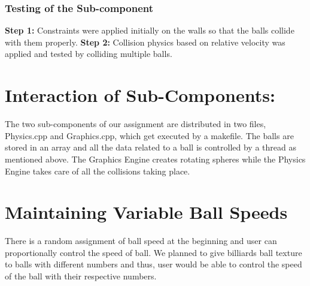 \documentclass{report}
\begin{document}
\subsubsection{Testing of the Sub-component}
 
\textbf{Step 1:} Constraints were applied initially on the walls so that the balls collide with them properly.
\linebreak
\linebreak
\textbf{Step 2:} Collision physics based on relative velocity was applied and tested by colliding multiple balls.
\linebreak
\linebreak
\pagebreak

\section{Interaction of Sub-Components:}
The two sub-components of our assignment are distributed in two files, Physics.cpp and Graphics.cpp, which get executed by a makefile. The balls are stored in an array and all the data related to a ball is controlled by a thread as mentioned above. The Graphics Engine creates rotating spheres while the Physics Engine takes care of all the collisions taking place.

\section{Maintaining Variable Ball Speeds}
There is a random assignment of ball speed at the beginning and user can proportionally control the speed of ball. We planned to give billiards ball texture to balls with different numbers and thus, user would be able to control the speed of the ball with their respective numbers.
\end{document}
